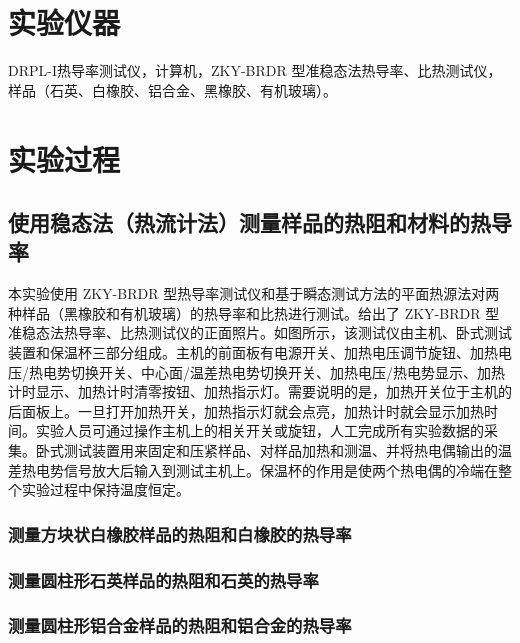 \documentclass[a4paper,utf8]{article}
\begin{document}
\section{实验仪器}%
    DRPL-I热导率测试仪，计算机，ZKY-BRDR 型准稳态法热导率、比热测试仪，样品（石英、白橡胶、铝合金、黑橡胶、有机玻璃）。
\section{实验过程}%
    \subsection{使用稳态法（热流计法）测量样品的热阻和材料的热导率}
        本实验使用 ZKY-BRDR 型热导率测试仪和基于瞬态测试方法的平面热源法对两种样品（黑橡胶和有机玻璃）的热导率和比热进行测试。给出了 ZKY-BRDR 型准稳态法热导率、比热测试仪的正面照片。如图所示，该测试仪由主机、卧式测试装置和保温杯三部分组成。主机的前面板有电源开关、加热电压调节旋钮、加热电压/热电势切换开关、中心面/温差热电势切换开关、加热电压/热电势显示、加热计时显示、加热计时清零按钮、加热指示灯。需要说明的是，加热开关位于主机的后面板上。一旦打开加热开关，加热指示灯就会点亮，加热计时就会显示加热时间。实验人员可通过操作主机上的相关开关或旋钮，人工完成所有实验数据的采集。卧式测试装置用来固定和压紧样品、对样品加热和测温、并将热电偶输出的温差热电势信号放大后输入到测试主机上。保温杯的作用是使两个热电偶的冷端在整个实验过程中保持温度恒定。
        \subsubsection{测量方块状白橡胶样品的热阻和白橡胶的热导率}
        \subsubsection{测量圆柱形石英样品的热阻和石英的热导率}
        \subsubsection{测量圆柱形铝合金样品的热阻和铝合金的热导率}
\end{document}
